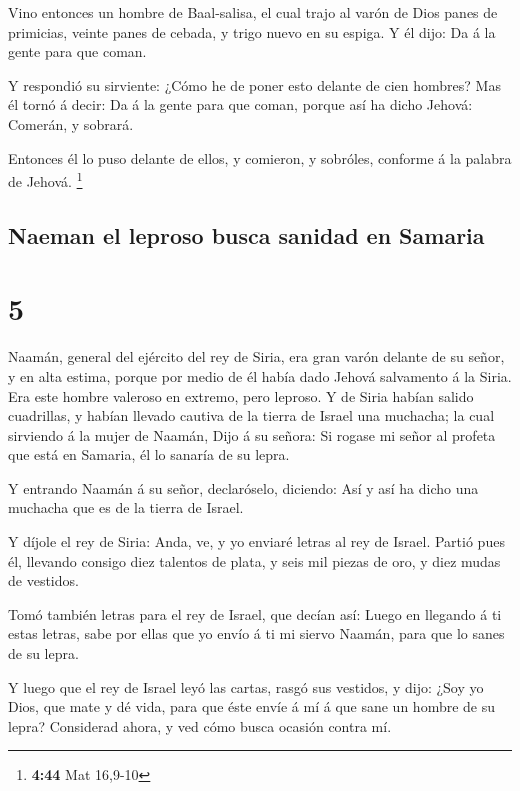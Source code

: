  Vino entonces un hombre de Baal-salisa, el cual trajo al
varón de Dios panes de primicias, veinte panes de cebada, y trigo nuevo
en su espiga. Y él dijo: Da á la gente para que coman.

 Y respondió su sirviente: ¿Cómo he de poner esto delante
de cien hombres? Mas él tornó á decir: Da á la gente para que coman,
porque así ha dicho Jehová: Comerán, y sobrará.

 Entonces él lo puso delante de ellos, y comieron, y
sobróles, conforme á la palabra de Jehová. \footnote{\textbf{4:44} Mat
  16,9-10}

\hypertarget{naeman-el-leproso-busca-sanidad-en-samaria}{%
\subsection{Naeman el leproso busca sanidad en
Samaria}\label{naeman-el-leproso-busca-sanidad-en-samaria}}

\hypertarget{section-4}{%
\section{5}\label{section-4}}

 Naamán, general del ejército del rey de Siria, era gran
varón delante de su señor, y en alta estima, porque por medio de él
había dado Jehová salvamento á la Siria. Era este hombre valeroso en
extremo, pero leproso.  Y de Siria habían salido cuadrillas,
y habían llevado cautiva de la tierra de Israel una muchacha; la cual
sirviendo á la mujer de Naamán,  Dijo á su señora: Si rogase
mi señor al profeta que está en Samaria, él lo sanaría de su lepra.

 Y entrando Naamán á su señor, declaróselo, diciendo: Así y
así ha dicho una muchacha que es de la tierra de Israel.

 Y díjole el rey de Siria: Anda, ve, y yo enviaré letras al
rey de Israel. Partió pues él, llevando consigo diez talentos de plata,
y seis mil piezas de oro, y diez mudas de vestidos.

 Tomó también letras para el rey de Israel, que decían así:
Luego en llegando á ti estas letras, sabe por ellas que yo envío á ti mi
siervo Naamán, para que lo sanes de su lepra.

 Y luego que el rey de Israel leyó las cartas, rasgó sus
vestidos, y dijo: ¿Soy yo Dios, que mate y dé vida, para que éste envíe
á mí á que sane un hombre de su lepra? Considerad ahora, y ved cómo
busca ocasión contra mí.

